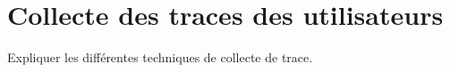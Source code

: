 \section{Collecte des traces des utilisateurs}
	Expliquer les différentes techniques de collecte de trace.
